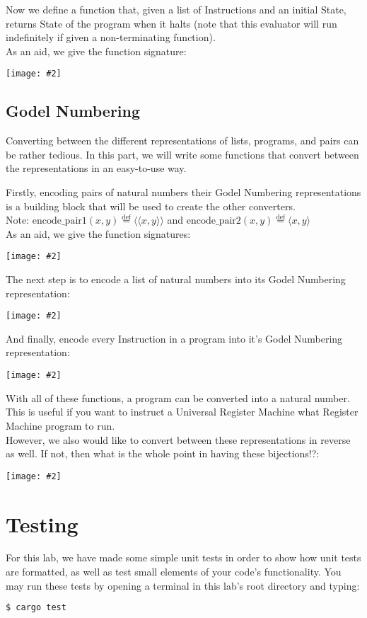 \documentclass{report}
\newcommand{\centerimg}[2]{\begin{center}\texttt{[image: \#2]}\end{center}}
\newcommand*{\defeq}{\stackrel{\text{def}}{=}}
\begin{document}
Now we define a function that, given a list of Instructions and an initial State,
returns State of the program when it halts (note that this evaluator will run
indefinitely if given a non-terminating function).\\


As an aid, we give the function signature:
\centerimg{width=\textwidth}{EvalProgram}

\subsection*{Godel Numbering}
Converting between the different representations of lists, programs, and pairs can
be rather tedious. In this part, we will write some functions that convert between
the representations in an easy-to-use way.


Firstly, encoding pairs of natural numbers their Godel Numbering representations
is a building block that will be used to create the other converters.
\\
Note: $\text{encode\_pair1}(x,y) \defeq \langle\langle x,y \rangle\rangle $ and 
$\text{encode\_pair2}(x,y) \defeq \langle x,y \rangle $\\

As an aid, we give the function signatures:
\centerimg{width=\textwidth}{EncodePairs}

The next step is to encode a list of natural numbers into its Godel Numbering representation:
\centerimg{width=\textwidth}{EncodeList}

And finally, encode every Instruction in a program into it's Godel Numbering representation:
\centerimg{width=\textwidth}{EncodeProgram}

With all of these functions, a program can be converted into a natural number.
This is useful if you want to instruct a Universal Register Machine what Register 
Machine program to run.\\

However, we also would like to convert between these representations in
reverse as well. If not, then what is the whole point in having these bijections!?:
\centerimg{width=\textwidth}{Decodes}

\section*{Testing}
For this lab, we have made some simple unit tests in order to show how unit tests
are formatted, as well as test small elements of your code's functionality.
You may run these tests by opening a terminal in this lab's root directory and typing:
\begin{lstlisting}[language=Bash]
    $ cargo test
\end{lstlisting}
\end{document}
